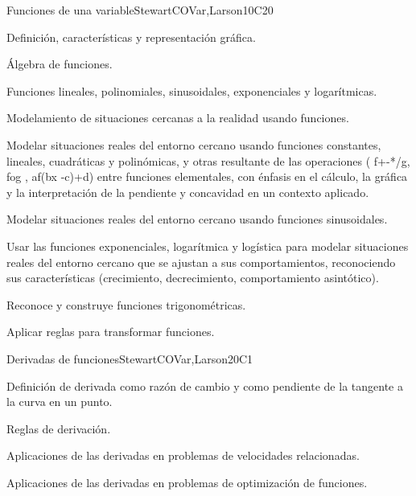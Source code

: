 \begin{syllabus}
\begin{unit}{Funciones de una variable}{}{StewartCOVar,Larson}{10}{C20}
   \begin{topics}
      \item Definición, características y representación gráfica.
      \item Álgebra de funciones.
      \item Funciones lineales, polinomiales, sinusoidales, exponenciales y logarítmicas.
      \item Modelamiento de situaciones cercanas a la realidad usando funciones.
   \end{topics}

   \begin{learningoutcomes}
      \item Modelar situaciones reales del entorno cercano usando funciones constantes, lineales, cuadráticas y polinómicas, y otras resultante de las operaciones ( f+-*/g, fog  , af(bx -c)+d) entre funciones elementales, con énfasis en el cálculo, la gráfica y la interpretación de la pendiente y concavidad en un contexto aplicado. 
      \item Modelar situaciones reales del entorno cercano usando funciones sinusoidales.
      \item Usar las funciones exponenciales, logarítmica y logística para modelar situaciones reales del entorno cercano que se ajustan a sus comportamientos, reconociendo sus características (crecimiento, decrecimiento, comportamiento asintótico).
      \item Reconoce y construye funciones trigonométricas.
      \item Aplicar reglas para transformar funciones.
   \end{learningoutcomes}
\end{unit}

\begin{unit}{Derivadas de funciones}{}{StewartCOVar,Larson}{20}{C1}
   \begin{topics}
      \item Definición de derivada como razón de cambio y como pendiente de la tangente a la curva en un punto.
      \item Reglas de derivación.
      \item Aplicaciones de las derivadas en problemas de velocidades relacionadas.
      \item Aplicaciones de las derivadas en problemas de optimización de funciones.
   \end{topics}


\end{unit}
\end{syllabus}
